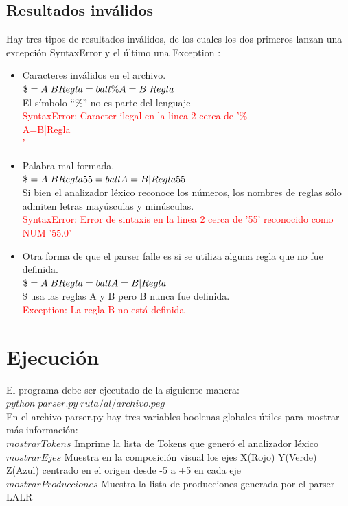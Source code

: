 \documentclass[10pt,a4paper]{article}
\begin{document}
\subsection{Resultados inválidos}
Hay tres tipos de resultados inválidos, de los cuales los dos primeros lanzan una excepción SyntaxError y el último una Exception :
\begin{itemize}
\item Caracteres inválidos en el archivo.\\$\$=A|B\\Regla=ball\%\\A=B|Regla$\\El símbolo ``\%'' no es parte del lenguaje\\
\textcolor{red}{SyntaxError: Caracter ilegal en la linea 2 cerca de '\%\\A=B|Regla\\'}
\item Palabra mal formada.\\$\$=A|B\\Regla55=ball\\A=B|Regla55$\\Si bien el analizador léxico reconoce los números, los nombres de reglas sólo admiten letras mayúsculas y minúsculas.\\
\textcolor{red}{SyntaxError: Error de sintaxis en la linea 2 cerca de '55' reconocido como NUM '55.0'}
\item Otra forma de que el parser falle es si se utiliza alguna regla que no fue definida.\\$\$=A|B\\Regla=ball\\A=B|Regla$\\\$ usa las reglas A y B pero B nunca fue definida.\\
\textcolor{red}{Exception: La regla B no está definida}
\end{itemize}
\section{Ejecución}
El programa debe ser ejecutado de la siguiente manera:\\
$python\;parser.py\;ruta/al/archivo.peg$\\

En el archivo parser.py hay tres variables boolenas globales útiles para mostrar más información:\\
	$mostrarTokens$ Imprime la lista de Tokens que generó el analizador léxico\\
	$mostrarEjes$ Muestra en la composición visual los ejes X(Rojo) Y(Verde) Z(Azul) centrado en el origen desde -5 a +5 en cada eje\\
	$mostrarProducciones$ Muestra la lista de producciones generada por el parser LALR\\
\end{document}

